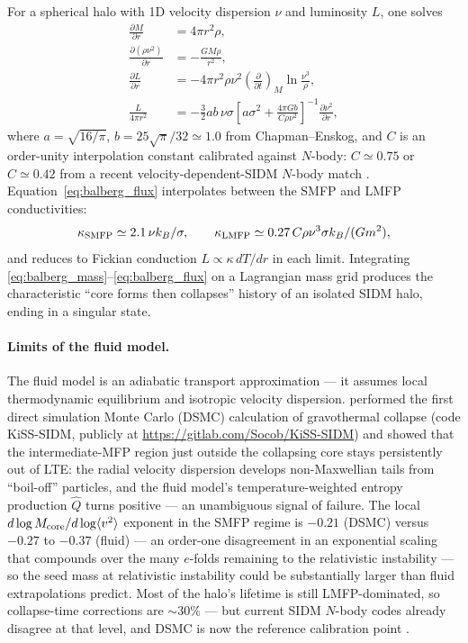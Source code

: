\documentclass[12pt]{article}
\begin{document}
For a spherical halo with 1D velocity dispersion $\nu$ and
luminosity $L$, one solves
%
\begin{align}
  \frac{\partial M}{\partial r} &= 4\pi r^2\rho,
  \label{eq:balberg_mass}\\
  \frac{\partial(\rho\nu^2)}{\partial r} &= -\frac{GM\rho}{r^2},
  \label{eq:balberg_hse}\\
  \frac{\partial L}{\partial r} &= -4\pi r^2\rho\nu^2
    \left(\frac{\partial}{\partial t}\right)_{\!M}\!\ln\frac{\nu^3}{\rho},
  \label{eq:balberg_energy}\\
  \frac{L}{4\pi r^2}
   &= -\frac{3}{2}ab\,\nu\sigma
      \left[a\sigma^2 + \frac{4\pi G b}{C\rho\nu^2}\right]^{-1}
      \frac{\partial\nu^2}{\partial r},
  \label{eq:balberg_flux}
\end{align}
%
where $a = \sqrt{16/\pi}$, $b = 25\sqrt{\pi}/32 \simeq 1.0$ from
Chapman--Enskog, and $C$ is an order-unity interpolation constant
calibrated against $N$-body: $C \simeq 0.75$
\citep{Balberg2002,Pollack2015} or $C \simeq 0.42$ from a recent
velocity-dependent-SIDM $N$-body match \citep{Meshveliani2023}.
Equation~\eqref{eq:balberg_flux} interpolates between the SMFP and LMFP
conductivities:
%
\begin{equation}
  \kappa_{\rm SMFP} \simeq 2.1\,\nu k_B/\sigma,
  \qquad
  \kappa_{\rm LMFP} \simeq 0.27\,C\rho\nu^3\sigma k_B/(Gm^2),
\end{equation}
%
and reduces to Fickian conduction $L \propto \kappa\,dT/dr$ in each
limit.  Integrating
\eqref{eq:balberg_mass}--\eqref{eq:balberg_flux} on a Lagrangian mass
grid produces the characteristic ``core forms then collapses'' history
of an isolated SIDM halo, ending in a singular state.

\paragraph{Limits of the fluid model.}  The fluid model is an
adiabatic transport approximation --- it assumes local thermodynamic
equilibrium and isotropic velocity dispersion.  \citet{Gurian2025Core}
performed the first direct simulation Monte Carlo (DSMC) calculation
of gravothermal collapse (code KiSS-SIDM, publicly at
\url{https://gitlab.com/Socob/KiSS-SIDM}) and showed that
the intermediate-MFP region just outside the collapsing core stays
persistently out of LTE: the radial velocity dispersion develops
non-Maxwellian tails from ``boil-off'' particles, and the fluid
model's temperature-weighted entropy production $\hat Q$ turns positive
--- an unambiguous signal of failure.  The local
$d\log M_{\rm core}/d\log\langle v^2\rangle$ exponent in the SMFP
regime is $-0.21$ (DSMC) versus $-0.27$ to $-0.37$ (fluid) --- an
order-one disagreement in an exponential scaling that compounds over
the many $e$-folds remaining to the relativistic instability --- so
the seed mass at relativistic instability could be substantially
larger than fluid extrapolations predict.  Most of the halo's lifetime is still
LMFP-dominated, so collapse-time corrections are $\sim 30\%$ --- but
current SIDM $N$-body codes already disagree at that level, and DSMC is
now the reference calibration point \citep{Gurian2025Core}.
\end{document}

